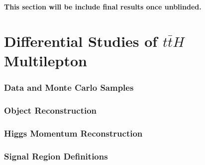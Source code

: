 \documentclass[12pt]{report}	%
\theoremstyle{definition}
\theoremstyle{remark}
\begin{document}
\textbf{This section will be include final results once unblinded.}


\part{Differential Studies of $t\bar{t}H$ Multilepton }
\label{part:analysis}


\section{Data and Monte Carlo Samples}
\label{sec:dataMC}



\section{Object Reconstruction}
\label{sec:objReco}



\section{Higgs Momentum Reconstruction}
\label{sec:mva}



\section{Signal Region Definitions}
\label{sec:signal_region}



%
\end{document}
